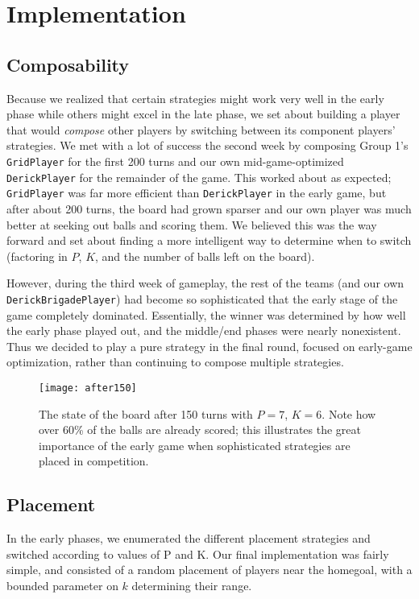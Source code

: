 \documentclass[
10pt, %
letterpaper, %
oneside, %
headinclude,footinclude, %
english
]{article}
\begin{document}
\section{Implementation}

\subsection{Composability}
Because we realized that certain strategies might work very well in the early phase while others might excel in the late phase, we set about building a player that would \textit{compose} other players by switching between its component players' strategies. We met with a lot of success the second week by composing Group 1's \texttt{GridPlayer} for the first 200 turns and our own mid-game-optimized \texttt{DerickPlayer} for the remainder of the game. This worked about as expected; \texttt{GridPlayer} was far more efficient than \texttt{DerickPlayer} in the early game, but after about 200 turns, the board had grown sparser and our own player was much better at seeking out balls and scoring them. We believed this was the way forward and set about finding a more intelligent way to determine when to switch (factoring in $P$, $K$, and the number of balls left on the board).

However, during the third week of gameplay, the rest of the teams (and our own \texttt{DerickBrigadePlayer}) had become so sophisticated that the early stage of the game completely dominated. Essentially, the winner was determined by how well the early phase played out, and the middle/end phases were nearly nonexistent. Thus we decided to play a pure strategy in the final round, focused on early-game optimization, rather than continuing to compose multiple strategies.

\begin{figure}[h!]
\centering 
\texttt{[image: after150]} 
\caption[State of a parallel football board after 150 turns]{The state of the board after 150 turns with $P=7$, $K=6$. Note how over 60\% of the balls are already scored; this illustrates the great importance of the early game when sophisticated strategies are placed in competition.}
\label{fig:gallery2} 
\end{figure}

\subsection{Placement}
In the early phases, we enumerated the different placement strategies and switched according to values of P and K. Our final implementation was fairly simple, and consisted of a random placement of players near the homegoal, with a bounded parameter on $k$ determining their range.
\end{document}

